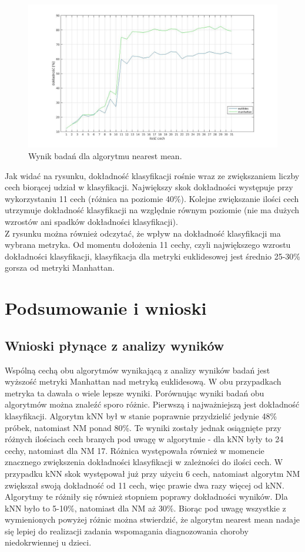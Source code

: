 \documentclass[11pt, a4paper, titlepage]{report}
\begin{document}
\begin{figure}[h]
  \centering
  \label{fig:nm_res}
  \includegraphics[scale=0.4]{obrazki/nm_plot}
  \caption{Wynik badań dla algorytmu nearest mean.}
\end{figure}

Jak widać na rysunku, dokładność klasyfikacji rośnie wraz ze zwiększaniem liczby cech biorącej udział w klasyfikacji. Największy skok dokładności występuje przy wykorzystaniu 11 cech (różnica na poziomie 40\%). Kolejne zwiększanie ilości cech utrzymuje dokładność klasyfikacji na względnie równym poziomie (nie ma dużych wzrostów ani spadków dokładności klasyfikacji).\\
Z rysunku można również odczytać, że wpływ na dokładność klasyfikacji ma wybrana metryka. Od momentu dołożenia 11 cechy, czyli największego wzrostu dokładności klasyfikacji, klasyfikacja dla metryki euklidesowej jest średnio 25-30\% gorsza od metryki Manhattan.

\chapter{Podsumowanie i wnioski}
\label{chap:Podsumowanie i wnioski}
\section{Wnioski płynące z analizy wyników}
Wspólną cechą obu algorytmów wynikającą z analizy wyników badań jest wyższość metryki Manhattan nad metryką euklidesową. W obu przypadkach metryka ta dawała o wiele lepsze wyniki.
Porównując wyniki badań obu algorytmów można znaleźć sporo różnic. Pierwszą i najważniejszą jest dokładność klasyfikacji. Algorytm kNN był w stanie poprawnie przydzielić jedynie 48\% próbek, natomiast NM ponad 80\%. Te wyniki zostały jednak osiągnięte przy różnych ilościach cech branych pod uwagę w algorytmie - dla kNN były to 24 cechy, natomiast dla NM 17. Różnica występowała również w momencie znacznego zwiększenia dokładności klasyfikacji w zależności do ilości cech. W przypadku kNN skok występował już przy użyciu 6 cech, natomiast algorytm NM zwiększał swoją dokładność od 11 cech, więc prawie dwa razy więcej od kNN. Algorytmy te różniły się również stopniem poprawy dokładności wyników. Dla kNN było to 5-10\%, natomiast dla NM aż 30\%. Biorąc pod uwagę wszystkie z wymienionych powyżej różnic można stwierdzić, że algorytm nearest mean nadaje się lepiej do realizacji zadania wspomagania diagnozowania choroby niedokrwiennej u dzieci.
\end{document}
